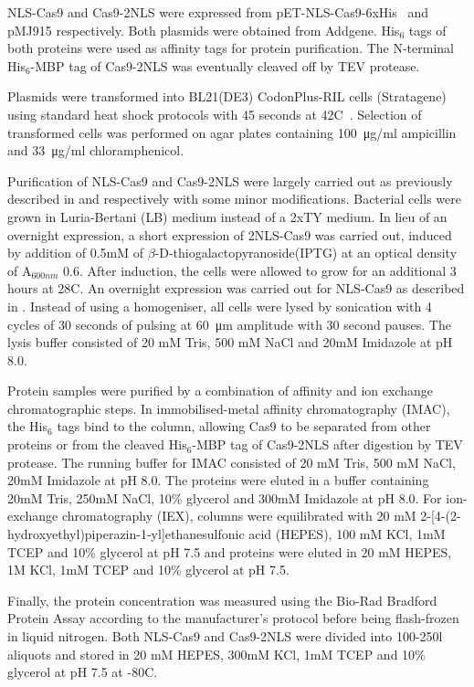 \documentclass[11pt]{article}
\begin{document}
NLS-Cas9 and Cas9-2NLS were expressed from pET-NLS-Cas9-6xHis~\citep{Zuris2014} and pMJ915 \citep{Sambrook2001} respectively. Both plasmids were obtained from Addgene. His$_{6}$ tags of both proteins were used as affinity tags for protein purification. The N-terminal His$_{6}$-MBP tag of Cas9-2NLS was eventually cleaved off by TEV protease.

Plasmids were transformed into BL21(DE3) CodonPlus-RIL cells (Stratagene) using standard heat shock protocols with 45 seconds at 42\degree C~\citep{Sambrook2001}. Selection of transformed cells was performed on agar plates containing \SI{100}{\micro\gram}/ml ampicillin and \SI{33}{\micro\gram}/ml chloramphenicol. 

Purification of NLS-Cas9 and Cas9-2NLS were largely carried out as previously described in \cite{Jinek2012a} and \cite{Zuris2014} respectively with some minor modifications. Bacterial cells were grown in Luria-Bertani (LB) medium instead of a 2xTY medium. In lieu of an overnight expression, a short expression of 2NLS-Cas9 was carried out, induced by addition of 0.5mM of $\beta$-D-thiogalactopyranoside(IPTG) at an optical density of A$_{600nm}$ 0.6. After induction, the cells were allowed to grow for an additional 3 hours at 28\degree C. An overnight expression was carried out for NLS-Cas9 as described in \cite{Zuris2014}. Instead of using a homogeniser, all cells were lysed by sonication with 4 cycles of 30 seconds of pulsing at \SI{60}{\micro\metre} amplitude with 30 second pauses. The lysis buffer consisted of 20 mM Tris, 500 mM NaCl and 20mM Imidazole at pH 8.0.

Protein samples were purified by a combination of affinity and ion exchange chromatographic steps. In immobilised-metal affinity chromatography (IMAC), the His$_{6}$ tags bind to the column, allowing Cas9 to be separated from other proteins or from the cleaved His$_{6}$-MBP tag of Cas9-2NLS after digestion by TEV protease. The running buffer for IMAC consisted of 20 mM Tris, 500 mM NaCl, 20mM Imidazole at pH 8.0. The proteins were eluted in a buffer containing 20mM Tris, 250mM NaCl, 10\% glycerol and 300mM Imidazole at pH 8.0. For ion-exchange chromatography (IEX), columns were equilibrated with 20 mM 2-[4-(2-hydroxyethyl)piperazin-1-yl]ethanesulfonic acid (HEPES), 100 mM KCl, 1mM TCEP and 10\% glycerol at pH 7.5 and proteins were eluted in 20 mM HEPES, 1M KCl, 1mM TCEP and 10\% glycerol at pH 7.5. 

Finally, the protein concentration was measured using the Bio-Rad Bradford Protein Assay according to the manufacturer's protocol before being flash-frozen in liquid nitrogen. Both NLS-Cas9 and Cas9-2NLS were divided into 100-250\micro l aliquots and stored in 20 mM HEPES, 300mM KCl, 1mM TCEP and 10\% glycerol at pH 7.5 at -80\degree C.
\end{document}
